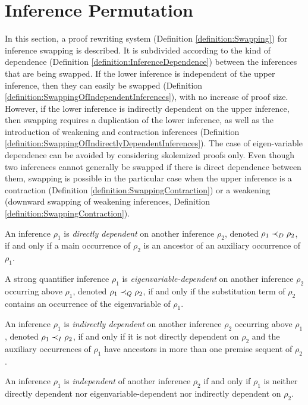 

\section{Inference Permutation}
\label{appendix:InferencePermutation}

In this section, a proof rewriting system (Definition \ref{definition:Swapping}) for inference swapping
is described. It is subdivided according to the kind of dependence (Definition \ref{definition:InferenceDependence}) between the inferences that are being swapped. If the lower inference is independent of the upper inference, then they can easily be swapped (Definition \ref{definition:SwappingOfIndependentInferences}), with no increase of proof size. However, if the lower inference is indirectly dependent on the upper inference, then swapping requires a duplication of the lower inference, as well as the introduction of weakening and contraction inferences (Definition \ref{definition:SwappingOfIndirectlyDependentInferences}). The case of eigen-variable dependence can be avoided by considering skolemized proofs only. Even though two inferences cannot generally be swapped if there is direct dependence between them, swapping is possible in the particular case when the upper inference is a contraction (Definition \ref{definition:SwappingContraction}) or a weakening (downward swapping of weakening inferences, Definition \ref{definition:SwappingContraction}). 



\begin{definition}
\label{definition:InferenceDependence}
An inference $\rho_1$ is \emph{directly dependent} on another inference $\rho_2$, denoted $\rho_1 \prec_D \rho_2$, if and only if a main occurrence of $\rho_2$ is an ancestor of an auxiliary occurrence of $\rho_1$. 

A strong quantifier inference $\rho_1$ is \emph{eigenvariable-dependent} on another inference $\rho_2$ occurring above $\rho_1$, denoted $\rho_1 \prec_Q \rho_2$, if and only if the substitution term of $\rho_2$ contains an occurrence of the eigenvariable of $\rho_1$.

An inference $\rho_1$ is \emph{indirectly dependent} on another inference $\rho_2$ occurring above $\rho_1$, denoted $\rho_1 \prec_I \rho_2$, if and only if it is not directly dependent on $\rho_2$ and the auxiliary occurrences of $\rho_1$ have ancestors in more than one premise sequent of $\rho_2$.

An inference $\rho_1$ is \emph{independent} of another inference $\rho_2$ if and only if $\rho_1$ is neither directly dependent nor eigenvariable-dependent nor indirectly dependent on $\rho_2$. 
\end{definition}





